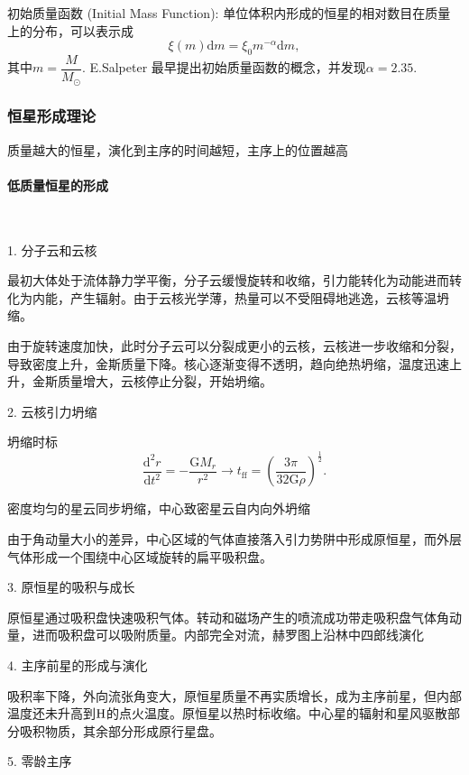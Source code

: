 \documentclass[../天体物理基础.tex]{subfiles}
\begin{document}
初始质量函数 (Initial Mass Function): 单位体积内形成的恒星的相对数目在质量上的分布，可以表示成
\begin{equation}
\xi\left(m\right)\mathrm{d}m=\xi_{0}m^{-\alpha}\mathrm{d}m,
\end{equation}
其中$m=\dfrac{M}{M_{\odot}}$. E.Salpeter 最早提出初始质量函数的概念，并发现$\alpha=2.35$.

\subsubsection{恒星形成理论}

质量越大的恒星，演化到主序的时间越短，主序上的位置越高

\paragraph{低质量恒星的形成}~{}

1. 分子云和云核

最初大体处于流体静力学平衡，分子云缓慢旋转和收缩，引力能转化为动能进而转化为内能，产生辐射。由于云核光学薄，热量可以不受阻碍地逃逸，云核等温坍缩。

由于旋转速度加快，此时分子云可以分裂成更小的云核，云核进一步收缩和分裂，导致密度上升，金斯质量下降。核心逐渐变得不透明，趋向绝热坍缩，温度迅速上升，金斯质量增大，云核停止分裂，开始坍缩。

2. 云核引力坍缩

坍缩时标
\begin{equation}
\frac{\mathrm{d}^{2}r}{\mathrm{d}t^{2}}=-\frac{\mathrm{G}M_{r}}{r^{2}}\to t_{\text{ff}}=\left(\frac{3\pi{}}{32\mathrm{G}\rho}\right)^{\frac{1}{2}}.
\end{equation}

密度均匀的星云同步坍缩，中心致密星云自内向外坍缩

由于角动量大小的差异，中心区域的气体直接落入引力势阱中形成原恒星，而外层气体形成一个围绕中心区域旋转的扁平吸积盘。

3. 原恒星的吸积与成长

原恒星通过吸积盘快速吸积气体。转动和磁场产生的喷流成功带走吸积盘气体角动量，进而吸积盘可以吸附质量。内部完全对流，赫罗图上沿林中四郎线演化

4. 主序前星的形成与演化

吸积率下降，外向流张角变大，原恒星质量不再实质增长，成为主序前星，但内部温度还未升高到$\rm H$的点火温度。原恒星以热时标收缩。中心星的辐射和星风驱散部分吸积物质，其余部分形成原行星盘。

5. 零龄主序
\end{document}
